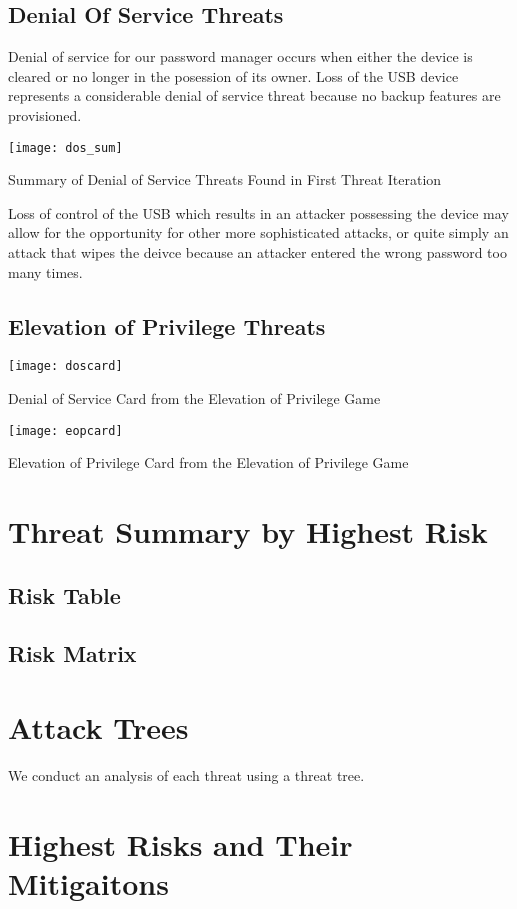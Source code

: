 \subsection{Denial Of Service Threats}
Denial of service for our password manager occurs when either the device is cleared or no longer in the posession of its owner.  Loss of the USB device represents a considerable denial of service threat because no backup features are provisioned. 
\begin{table*}[ht]
    \centering
    \texttt{[image: dos\_sum]}
    \caption{Summary of Denial of Service Threats Found in First Threat Iteration}
    \label{tab:dossum}
\end{table*}

Loss of control of the USB which results in an attacker possessing the device may allow for the opportunity for other more sophisticated attacks, or quite simply an attack that wipes the deivce because an attacker entered the wrong password too many times.





\subsection{Elevation of Privilege Threats}

\begin{marginfigure}%
\centering
  \texttt{[image: doscard]}
  \caption{Denial of Service Card from the Elevation of Privilege Game}
  \label{fig:doscard}
\end{marginfigure}

\begin{marginfigure}%
\centering
  \texttt{[image: eopcard]}
  \caption{Elevation of Privilege Card from the Elevation of Privilege Game}
  \label{fig:eopcard}
\end{marginfigure}


\section{Threat Summary by Highest Risk}

\subsection{Risk Table}

\subsection{Risk Matrix}

\section{Attack Trees}
We conduct an analysis of each threat using a threat tree.

\section{Highest Risks and Their Mitigaitons}




